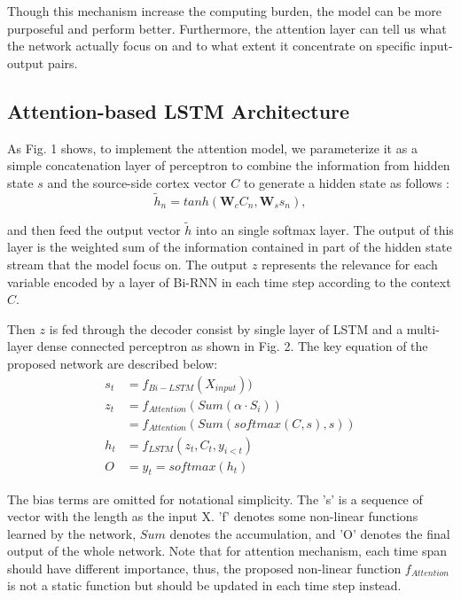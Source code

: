 \documentclass[journal]{IEEEtran}
\begin{document}
Though this mechanism increase the computing burden, the model can be more purposeful and perform better. Furthermore, the attention layer can tell us what the network actually focus on and to what extent it concentrate on specific input-output pairs.

\subsection{Attention-based LSTM Architecture}	
As Fig. 1 shows, to implement the attention model, we parameterize it as a simple concatenation layer of perceptron to combine the information from hidden state $s$ and the source-side cortex vector $C$ to generate a hidden state as follows \cite{luong2015effective}:
\begin{equation}
\tilde{h}_n = tanh(\textbf{W}_{c}C_n, \textbf{W}_{s}s_n),
\end{equation}

and then feed the output vector $\tilde{h}$ into an single softmax layer. The output of this layer is the weighted sum of the information contained in part of the hidden state stream that the model focus on. The output $z$  represents the relevance for each variable encoded by a layer of Bi-RNN in each time step according to the context $C$.

Then $z$ is fed through the decoder consist by single layer of LSTM and a multi-layer dense connected perceptron as shown in Fig. 2. The key equation of the proposed network are described below:
\[
\begin{aligned}
s_t &= f_{Bi-LSTM}(X_{input}))\\
z_t & = f_{Attention} ( Sum (\alpha \cdot S_i))\\
& = f_{Attention}(Sum (softmax(C, s), s))\\
h_t &= f_{LSTM} (z_t, C_t, y_{i<t})\\
O &= y_t = softmax(h_t)
\end{aligned}
\]

The bias terms are omitted for notational simplicity. The 's' is a sequence of vector with the length as the input X. 'f' denotes some non-linear functions learned by the network, $Sum$ denotes the accumulation, and 'O' denotes the final output of the whole network. Note that for attention mechanism, each time span should have different importance, thus, the proposed non-linear function $f_{Attention}$ is not a static function but should be updated in each time step instead.
\end{document}
